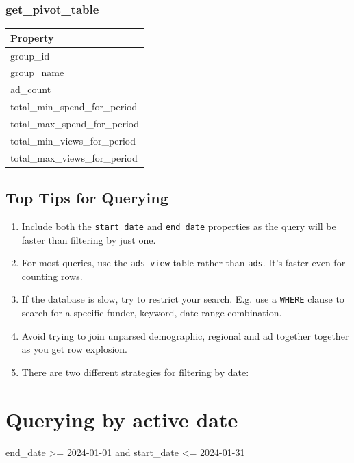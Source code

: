 \documentclass[
  letterpaper,
  DIV=11,
  numbers=noendperiod]{scrreprt}
\newenvironment{Shaded}{\begin{snugshade}}{\end{snugshade}}
\newcommand{\DecValTok}[1]{\textcolor[rgb]{0.68,0.00,0.00}{#1}}
\newcommand{\KeywordTok}[1]{\textcolor[rgb]{0.00,0.23,0.31}{#1}}
\newcommand{\NormalTok}[1]{\textcolor[rgb]{0.00,0.23,0.31}{#1}}
\newcommand{\OperatorTok}[1]{\textcolor[rgb]{0.37,0.37,0.37}{#1}}
\begin{document}
\subsection{get\_pivot\_table}

\begin{longtable}[]{@{}l@{}}
\toprule\noalign{}
Property \\
\midrule\noalign{}
\endhead
\bottomrule\noalign{}
\endlastfoot
group\_id \\
group\_name \\
ad\_count \\
total\_min\_spend\_for\_period \\
total\_max\_spend\_for\_period \\
total\_min\_views\_for\_period \\
total\_max\_views\_for\_period \\
\end{longtable}

\section{Top Tips for Querying}\label{top-tips-for-querying}

\begin{enumerate}
\def\labelenumi{\arabic{enumi}.}
\item
  Include both the \texttt{start\_date} and \texttt{end\_date}
  properties as the query will be faster than filtering by just one.
\item
  For most queries, use the \texttt{ads\_view} table rather than
  \texttt{ads}. It's faster even for counting rows.
\item
  If the database is slow, try to restrict your search. E.g. use a
  \texttt{WHERE} clause to search for a specific funder, keyword, date
  range combination.
\item
  Avoid trying to join unparsed demographic, regional and ad together
  together as you get row explosion.
\item
  There are two different strategies for filtering by date:
\end{enumerate}

\chapter{Querying by active date}

\begin{Shaded}
\begin{Highlighting}[]
\NormalTok{end\_date }\OperatorTok{\textgreater{}=} \DecValTok{2024}\OperatorTok{{-}}\DecValTok{01}\OperatorTok{{-}}\DecValTok{01} \KeywordTok{and}\NormalTok{ start\_date }\OperatorTok{\textless{}=} \DecValTok{2024}\OperatorTok{{-}}\DecValTok{01}\OperatorTok{{-}}\DecValTok{31}
\end{Highlighting}
\end{Shaded}
\end{document}
